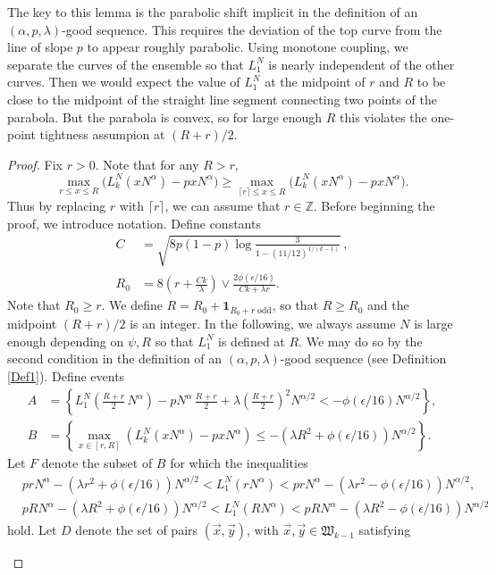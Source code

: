 	\begin{remark}
		The key to this lemma is the parabolic shift implicit in the definition of an $(\alpha,p,\lambda)$-good sequence. This requires the deviation of the top curve from the line of slope $p$ to appear roughly parabolic. Using monotone coupling, we separate the curves of the ensemble so that $L_1^N$ is nearly independent of the other curves. Then we would expect the value of $L_1^N$ at the midpoint of $r$ and $R$ to be close to the midpoint of the straight line segment connecting two points of the parabola. But the parabola is convex, so for large enough $R$ this violates the one-point tightness assumpion at $(R+r)/2$.
	\end{remark}
	
	\begin{proof}
		
		Fix $r>0$. Note that for any $R>r$,
		\[
		\max_{r\leq x\leq R} \big(L_k^N(xN^\alpha) - pxN^\alpha\big) \geq \max_{\lceil r\rceil \leq x \leq R} \big(L_k^N(xN^\alpha) - pxN^\alpha\big).
		\]
		Thus by replacing $r$ with $\lceil r\rceil$, we can assume that $r\in\mathbb{Z}$. Before beginning the proof, we introduce notation. Define constants
		\begin{align}
		C &= \sqrt{ 8p(1-p) \log\frac{3}{1-(11/12)^{1/(k-1)}}}\,,\label{21Cdef}\\
		R_0 &= 8\left( r + \frac{Ck}{\lambda}\right) \vee \frac{2\phi(\epsilon/16)}{Ck+\lambda r}. \label{21Rdef}
		\end{align}
		Note that $R_0\geq r$. We define $R = R_0 + \mathbf{1}_{R_0 + r\;\mathrm{odd}}$, so that $R\geq R_0$ and the midpoint $(R+r)/2$ is an integer. In the following, we always assume $N$ is large enough depending on $\psi,R$ so that $L_1^N$ is defined at $R$. We may do so by the second condition in the definition of an $(\alpha,p,\lambda)$-good sequence (see Definition \ref{Def1}). Define events
		\begin{align*}
		A &= \left\{L_1^N\left(\frac{R+r}{2}\,N^\alpha\right) - pN^\alpha\,\frac{R+r}{2} + \lambda\left(\frac{R+r}{2}\right)^2 N^{\alpha/2} < -\phi(\epsilon/16)N^{\alpha/2}\right\},\\
		B &= \left\{\max_{x\in[r,R]} \left(L_k^N(xN^\alpha) - pxN^\alpha\right) \leq -(\lambda R^2 + \phi(\epsilon/16)) N^{\alpha/2} \right\}.
		\end{align*}
		Let $F$ denote the subset of $B$ for which the inequalities
		\begin{equation}\label{21x1y1}
		\begin{split}
		& prN^\alpha - (\lambda r^2+\phi(\epsilon/16))N^{\alpha/2} < L_1^N(rN^\alpha) <  prN^\alpha - (\lambda r^2-\phi(\epsilon/16))N^{\alpha/2},\\
		& pRN^\alpha - (\lambda R^2+\phi(\epsilon/16))N^{\alpha/2} < L_1^N(RN^\alpha) <  pRN^\alpha - (\lambda R^2-\phi(\epsilon/16))N^{\alpha/2}
		\end{split}
		\end{equation}
		hold. Let $D$ denote the set of pairs $(\vec{x},\vec{y})$, with $\vec{x},\vec{y}\in\mathfrak{W}_{k-1}$ satisfying 
		\begin{enumerate}[label=(\arabic*)]
			

\end{enumerate}
\end{proof}

